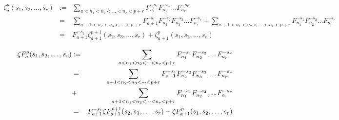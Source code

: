 \documentclass{jlreq}
\begin{document}
\begin{eqnarray*}
  \zeta_{a}^{p}(s_1,s_2,\dots,s_r) &:=& \sum_{a<n_1<n_2< \dots <n_r<p+r}F_{n_1}^{-s_1}F_{n_2}^{-s_2}\dots F_{n_r}^{-s_r} \\
  &=& \sum_{a+1<n_2<n_3< \dots <p+r}F_{a+1}^{-s_1}F_{n_2}^{-s_2}F_{n_3}^{-s_3} \dots F_{n_r}^{-s_r} + \sum_{a+1<n_1<n_2< \dots <n_r<p+r}F_{n_1}^{-s_1}F_{n_2}^{-s_2}\dots F_{n_r}^{-s_r} \\
  &=& F_{a+1}^{-s_1} \zeta_{a+1}^{p+1}(s_2,s_3,\dots,s_r) + \zeta_{a+1}^{p}(s_1,s_2,\dots,s_r)
\end{eqnarray*}


\begin{eqnarray*}

    \zeta{\small F}_{a}^{p}(s_1,s_2,\dots,s_r) 
  
  &:=& \sum_{a<n_1<n_2< \dots <n_r<p+r}F_{n_1}^{-s_1}F_{n_2}^{-s_2}\dots F_{n_r}^{-s_r} \\
  
    &=& \sum_{a+1<n_2<n_3< \dots <p+r}F_{a+1}^{-s_1}F_{n_2}^{-s_2}F_{n_3}^{-s_3} \dots F_{n_r}^{-s_r} \\ 
  
  &+& \sum_{a+1<n_1<n_2< \dots <n_r<p+r}F_{n_1}^{-s_1}F_{n_2}^{-s_2}\dots F_{n_r}^{-s_r} \\
  
    &=& F_{a+1}^{-s_1}  \zeta{\small F}_{a+1}^{p+1}(s_2,s_3,\dots,s_r) + \zeta{\small F}_{a+1}^{p}(s_1,s_2,\dots,s_r)
  
  \end{eqnarray*}
\end{document}
